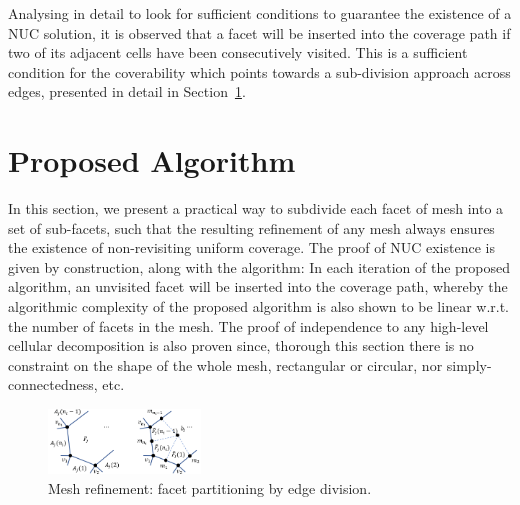 \documentclass[lettersize,journal]{IEEEtran}
\begin{document}
Analysing in detail to look for sufficient conditions to guarantee the existence of a NUC solution, it is observed that a facet will be inserted into the coverage path if two of its adjacent cells have been consecutively visited. 
This is a sufficient condition for the coverability which points towards a sub-division approach across edges, presented in detail in Section~\ref{section_algorithm}. 


\section{Proposed Algorithm}\label{section_algorithm}
In this section, we present a practical way to subdivide each facet of mesh into a set of sub-facets, such that the resulting refinement of any mesh always ensures the existence of non-revisiting uniform coverage. 
The proof of NUC existence is given by construction, along with the algorithm: 
In each iteration of the proposed algorithm, an unvisited facet will be inserted into the coverage path, whereby the algorithmic complexity of the proposed algorithm is also shown to be linear w.r.t. the number of facets in the mesh. 
The proof of independence to any high-level cellular decomposition is also proven since, thorough this section there is no constraint on the shape of the whole mesh, rectangular or circular, nor simply-connectedness, etc. 


\begin{figure}[t]
\centering
\includegraphics[width=0.36\textwidth]{figures/edge_subdivision}
\caption{Mesh refinement: facet partitioning by edge division. }\label{fig:edge_subdivision}
\end{figure}
\end{document}
